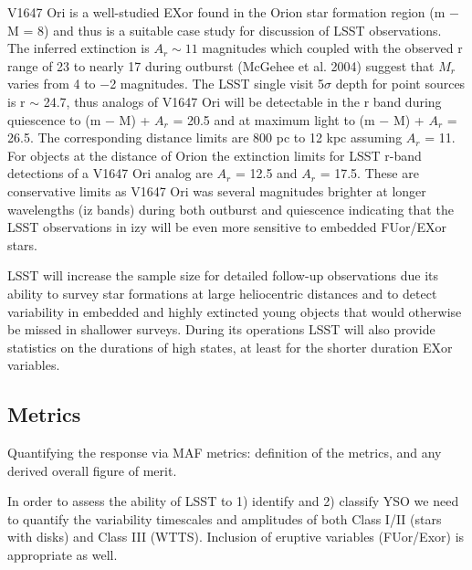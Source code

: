 V1647 Ori is a well-studied EXor found in the Orion star formation region (m − M = 8) and
thus is a suitable case study for discussion of LSST observations. 
The
inferred extinction is $A_r \sim 11$ magnitudes which coupled with the observed r range of 23 to nearly
17 during outburst (McGehee et al. 2004) suggest that $M_r$ varies from 4 to −2 magnitudes.
The LSST single visit 5$\sigma$ depth for point sources is r $\sim$ 24.7, thus analogs of V1647 Ori will
be detectable in the r band during quiescence to (m − M) + $A_r$ = 20.5 and at maximum light
to (m − M) + $A_r$ = 26.5. The corresponding distance limits are 800 pc to 12 kpc assuming
$A_r$ = 11. For objects at the distance of Orion the extinction limits for LSST r-band detections of
a V1647 Ori analog are $A_r$ = 12.5 and $A_r$ = 17.5. These are conservative limits as V1647 Ori was
several magnitudes brighter at longer wavelengths (iz bands) during both outburst and quiescence
indicating that the LSST observations in izy will be even more sensitive to embedded FUor/EXor
stars.

LSST will increase the sample size for detailed follow-up observations due its ability to survey
star formations at large heliocentric distances and to detect variability in embedded and highly
extincted young objects that would otherwise be missed in shallower surveys. During its operations
LSST will also provide statistics on the durations of high states, at least for the shorter duration
EXor variables.





\subsection{Metrics}
\label{sec:\secname:metrics}

Quantifying the response via MAF metrics: definition of the metrics,
and any derived overall figure of merit.


In order to assess the ability of LSST to 1) identify and 2) classify
YSO we need to quantify the variability timescales and amplitudes of
both Class I/II (stars with disks) and Class III (WTTS). Inclusion of
eruptive variables (FUor/Exor) is appropriate as well.

